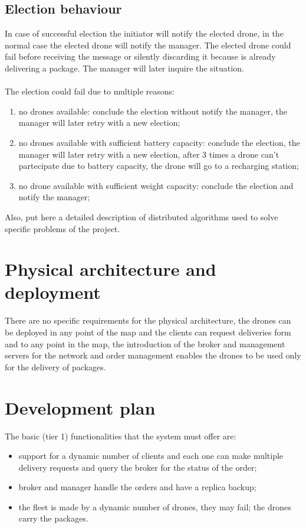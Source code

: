 \documentclass[a4paper, oneside]{memoir}
\begin{document}
\subsection{Election behaviour}
In case of successful election the initiator will notify the elected drone, in the normal case the elected drone will notify the manager.
The elected drone could fail before receiving the message or silently discarding it because is already delivering a package. The manager will later inquire the situation.
\\\\
The election could fail due to multiple reasons:
\begin{enumerate}
	\item no drones available: conclude the election without notify the manager, the manager will later retry with a new election;
	\item no drones available with sufficient battery capacity: conclude the election, the manager will later retry with a new election, after 3 times a drone can't partecipate due to battery capacity, the drone will go to a recharging station;
	\item no drone available with sufficient weight capacity: conclude the election and notify the manager;
\end{enumerate}



Also, put here a detailed description of distributed algorithms used to solve specific problems of the project.

\section{Physical architecture and deployment}
There are no specific requirements for the physical architecture, the drones can be deployed in any point of the map and the clients can request deliveries form and to any point in the map, the introduction of the broker and management servers for the network and order management enables the drones to be used only for the delivery of packages.


\section{Development plan}
The basic (tier 1) functionalities that the system must offer are:
\begin{itemize}
\item support for a dynamic number of clients and each one can make multiple delivery requests and query the broker for the status of the order;
\item broker and manager handle the orders and have a replica backup;
\item the fleet is made by a dynamic number of drones, they may fail; the drones carry the packages.
\end{itemize}
\end{document}
